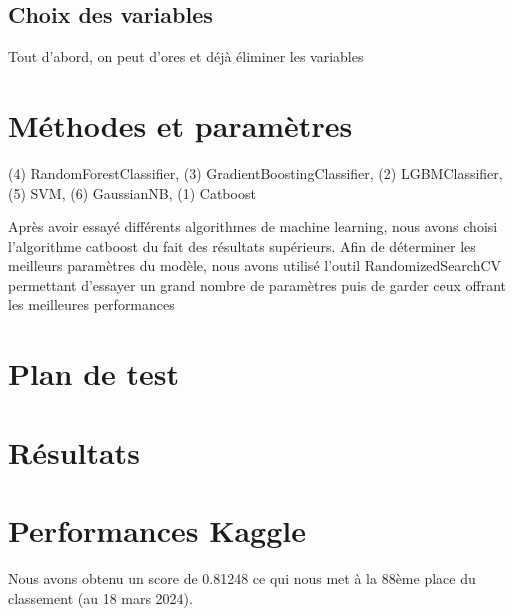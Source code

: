 \documentclass[a4paper]{article}
\begin{document}
    \subsection{Choix des variables}

    Tout d'abord, on peut d'ores et déjà éliminer les variables

    \section{Méthodes et paramètres}

    (4) RandomForestClassifier, (3) GradientBoostingClassifier, (2) LGBMClassifier, (5) SVM, (6) GaussianNB, (1) Catboost
    
    Après avoir essayé différents algorithmes de machine learning, nous avons choisi l'algorithme catboost du fait des résultats supérieurs.
    Afin de déterminer les meilleurs paramètres du modèle, nous avons utilisé l'outil RandomizedSearchCV permettant d'essayer un grand nombre 
    de paramètres puis de garder ceux offrant les meilleures performances

    \section{Plan de test}

    \section{Résultats}

    \section{Performances Kaggle}

    Nous avons obtenu un score de 0.81248 ce qui nous met à la 88ème place du classement (au 18 mars 2024).
\end{document}
